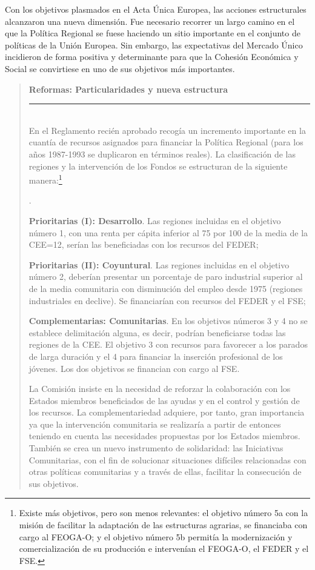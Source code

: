 \documentclass[10pt,a4paper]{article}
\newcounter{numitem}
\newenvironment{lnum}
      {\begin{list}{\arabic{numitem}.}{%
          \usecounter{numitem}%
          \setlength{\leftmargin}{1cm}%
          \setlength{\parskip}{3pt}%
          \setlength{\itemsep}{0pt}%
          \setlength{\parsep}{0pt}%
      }}
      {\end{list}}
\newenvironment{specialblock}[1]{%
      \begin{quote} %
      \small %
      \noindent\textbf{#1}\\[-0.3em] %
      \rule{\linewidth}{0.4pt}\\[0.6em]}{
      \end{quote}}
\begin{document}
Con los objetivos plasmados en el Acta Única Europea, las acciones estructurales alcanzaron una nueva dimensión. Fue necesario recorrer un largo camino en el que la Política Regional se fuese haciendo un sitio importante en el conjunto de políticas de la Unión Europea. Sin embargo, las expectativas del Mercado Único incidieron de forma positiva y determinante para que la Cohesión Económica y Social se convirtiese en uno de sus objetivos más importantes. 

\begin{specialblock}{Reformas: Particularidades y nueva estructura}
    En el Reglamento recién aprobado recogía un incremento importante en la cuantía de recursos asignados para financiar la Política Regional (para los años 1987-1993 se duplicaron en términos reales). La clasificación de las regiones y la intervención de los Fondos se estructuran de la siguiente manera:\footnote{%
        Existe más objetivos, pero son menos relevantes: el objetivo número 5a con la misión de facilitar la adaptación de las estructuras agrarias, se financiaba con cargo al FEOGA-O; y el objetivo número 5b permitía la modernización y comercialización de su producción e intervenían el FEOGA-O, el FEDER y el FSE.
    }
    \begin{lnum}
        \item \textbf{Prioritarias (I): Desarrollo}. Las regiones incluidas en el objetivo número 1, con una renta per cápita inferior al 75 por 100 de la media de la CEE=12, serían las beneficiadas con los recursos del FEDER;
        \item \textbf{Prioritarias (II): Coyuntural}. Las regiones incluidas en el objetivo número 2, deberían presentar un porcentaje de paro industrial superior al de la media comunitaria con disminución del empleo desde 1975 (regiones industriales en declive). Se financiarían con recursos del FEDER y el FSE;
        \item \textbf{Complementarias: Comunitarias}. En los objetivos números 3 y 4 no se establece delimitación alguna, es decir, podrían beneficiarse todas las regiones de la CEE. El objetivo 3 con recursos para favorecer a los parados de larga duración y el 4 para financiar la inserción profesional de los jóvenes. Los dos objetivos se financian con cargo al FSE.
    \end{lnum}
    
    La Comisión insiste en la necesidad de reforzar la colaboración con los Estados miembros beneficiados de las ayudas y en el control y gestión de los recursos. La complementariedad adquiere, por tanto, gran importancia ya que la intervención comunitaria se realizaría a partir de entonces teniendo en cuenta las necesidades propuestas por los Estados miembros. También se crea un nuevo instrumento de solidaridad: las Iniciativas Comunitarias, con el fin de solucionar situaciones difíciles relacionadas con otras políticas comunitarias y a través de ellas, facilitar la consecución de sus objetivos.


\end{specialblock}
\end{document}
